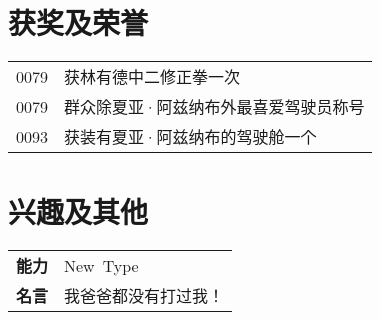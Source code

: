 \documentclass[a4paper, 10pt]{ctexart}
\begin{document}
\noindent
\begin{tabular}{p{2.4cm}|p{11cm}}
\end{tabular}

\section{获奖及荣誉}
\noindent
\begin{tabular}{rl}
0079&获林有德中二修正拳一次\\
0079&群众除夏亚·阿兹纳布外最喜爱驾驶员称号\\
0093&获装有夏亚·阿兹纳布的驾驶舱一个
\end{tabular}

\section{兴趣及其他}
\noindent
\begin{tabular}{rl}
\textbf{能力}&New~Type\\
\textbf{名言}&我爸爸都没有打过我！\\
\end{tabular}
\end{document}
